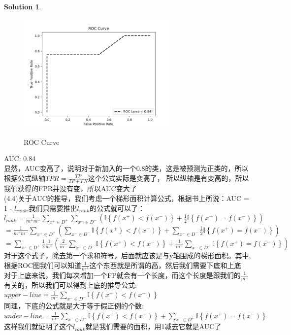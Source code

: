 \documentclass[a4paper,UTF8]{article}
\numberwithin{equation}{section}
\theoremstyle{definition}
\newtheorem*{solution}{Solution}
\begin{document}
\begin{solution}
    \begin{figure}[H]
        \centering
        \includegraphics[width=0.7\textwidth]{roc_drawing2.png}\\
        \caption{ROC Curve}
        \label{fig:roc_drawing_0.8}
    \end{figure}
    AUC: 0.84\\
    显然，AUC变高了，说明对于新加入的一个0.8的类，这是被预测为正类的，所以根据公式纵轴$TPR = \frac{TP}{TP+FN}$这个公式实际是变高了，
    所以纵轴是有变高的，所以我们获得的FPR并没有变，所以AUC变大了\\
    (4.4)关于AUC的推导，我们考虑一个梯形面积计算公式，根据书上所说：AUC = 1 - $l_{rank}$,我们只需要推出$l_{rank}$的公式就可以了：\\
    $l_{rank} = \frac{1}{m^+m^-}\sum_{x^+\in D^+}\sum_{x^-\in D^-}\left(\mathbb{I}\left\{f(x^+) < f(x^-)\right\}+\frac{1}{2}\mathbb{I}\left\{f(x^+)=f(x^-)\right\}\right)$\\
    $= \frac{1}{m^+m^-}\sum_{x^+\in D^+}\left(  \sum_{x^-\in D^-} \mathbb{I}\left\{f(x^+) < f(x^-)\right\}+ \sum_{x^-\in D^-}\frac{1}{2}\mathbb{I}\left\{f(x^+)=f(x^-)\right\}\right)$\\
    $= \sum_{x^+\in D^+}\frac{1}{2}\frac{1}{m^+}\left( \frac{2}{m^-} \sum_{x^-\in D^-} \mathbb{I}\left\{f(x^+) < f(x^-)\right\}+ \frac{1}{m^-}\sum_{x^-\in D^-}\mathbb{I}\left\{f(x^+)=f(x^-)\right\}\right)$\\
    对于这个式子，除去第一个求和符号，后面就应该是与y轴围成的梯形面积。其中,根据ROC图我们可以知道$\frac{1}{m^+}$这个东西就是所谓的高，然后我们需要下底和上底\\
    对于上底来说，我们每次增加一个FP就会有一个长度，而这个长度是跟我们的$\frac{1}{m^-}$有关的，所以我们可以得到上底的推导公式:\\
    $upper-line = \frac{1}{m^-} \sum_{x^-\in D^-} \mathbb{I}\left\{f(x^+) < f(x^-)\right\}$\\
    同理，下底的公式就是大于等于假正例的个数:\\
    $under-line = \frac{1}{m^-} \sum_{x^-\in D^-} \mathbb{I}\left\{f(x^+) < f(x^-)\right\} + \sum_{x^-\in D^-} \mathbb{I}\left\{f(x^+) = f(x^-)\right\}$\\
    这样我们就证明了这个$l_{rank}$就是我们需要的面积，用1减去它就是AUC了\\
\end{solution}
\end{document}
